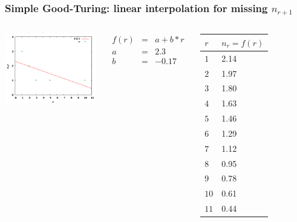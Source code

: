 \begin{frame}
\frametitle{Simple Good-Turing: linear interpolation for missing $n_{r+1}$}
\begin{columns}[l]
\includegraphics[scale=0.55]{figures/fit.png}
{\small
\begin{eqnarray*}
f(r) & = & a + b * r \\
a & = & 2.3 \\
b & = & -0.17 
\end{eqnarray*}
\begin{tabular}{ll}
\hline
$r$ & $n_r = f(r)$  \\
\hline
$1$ & 2.14 \\
$2$ & 1.97 \\
$3$ & 1.80 \\
$4$ & 1.63 \\
$5$ & 1.46 \\
$6$ & 1.29 \\
$7$ & 1.12 \\
$8$ & 0.95 \\
$9$ & 0.78 \\
$10$ & 0.61 \\
$11$ & 0.44 \\
\hline
\end{tabular}
}
\end{columns}
\end{frame}


